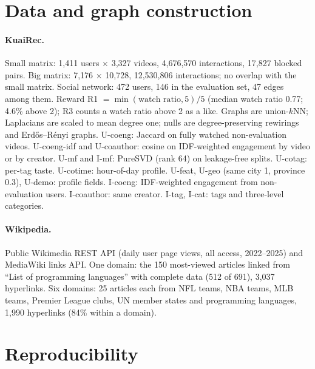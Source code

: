 \documentclass[11pt]{article}
\theoremstyle{definition}
\theoremstyle{remark}
\begin{document}
\section{Data and graph construction}\label{app:data}

\paragraph{KuaiRec.} Small matrix: 1,411 users $\times$ 3,327 videos, 4,676,570 interactions, 17,827 blocked pairs. Big matrix: 7,176 $\times$ 10,728, 12,530,806 interactions; no overlap with the small matrix. Social network: 472 users, 146 in the evaluation set, 47 edges among them. Reward R1 $=\min(\text{watch ratio},5)/5$ (median watch ratio 0.77; 4.6\% above 2); R3 counts a watch ratio above 2 as a like. Graphs are union-$k$NN; Laplacians are scaled to mean degree one; nulls are degree-preserving rewirings and Erd\H{o}s--R\'enyi graphs. U-coeng: Jaccard on fully watched non-evaluation videos. U-coeng-idf and U-coauthor: cosine on IDF-weighted engagement by video or by creator. U-mf and I-mf: PureSVD (rank 64) on leakage-free splits. U-cotag: per-tag taste. U-cotime: hour-of-day profile. U-feat, U-geo (same city 1, province 0.3), U-demo: profile fields. I-coeng: IDF-weighted engagement from non-evaluation users. I-coauthor: same creator. I-tag, I-cat: tags and three-level categories.

\paragraph{Wikipedia.} Public Wikimedia REST API (daily user page views, all access, 2022--2025) and MediaWiki links API. One domain: the 150 most-viewed articles linked from ``List of programming languages'' with complete data (512 of 691), 3,037 hyperlinks. Six domains: 25 articles each from NFL teams, NBA teams, MLB teams, Premier League clubs, UN member states and programming languages, 1,990 hyperlinks (84\% within a domain).

\section{Reproducibility}\label{app:repro}
\end{document}
